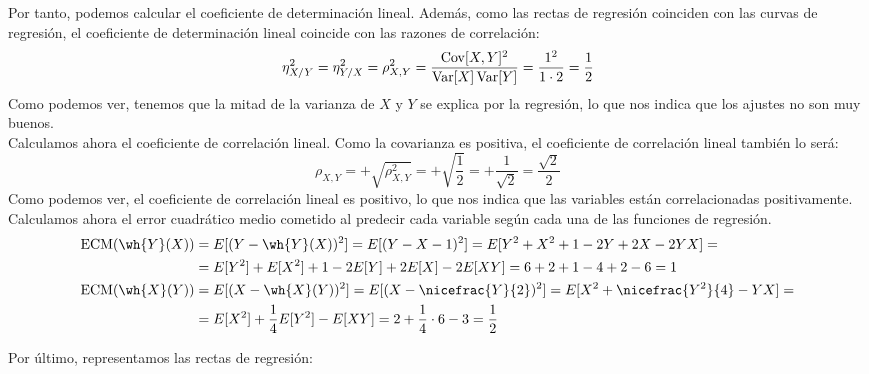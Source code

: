 \begin{ejercicio}
    Por tanto, podemos calcular el coeficiente de determinación lineal. Además, como las rectas de regresión coinciden con las curvas de regresión, el coeficiente de determinación lineal coincide con las razones de correlación:
    \begin{equation*}
        \eta_{X/Y}^2 = \eta_{Y/X}^2 = \rho_{X,Y}^2 = \dfrac{\operatorname{Cov}[X,Y]^2}{\operatorname{Var}[X]\operatorname{Var}[Y]} = \dfrac{1^2}{1\cdot 2} = \dfrac{1}{2}
    \end{equation*}
    Como podemos ver, tenemos que la mitad de la varianza de $X$ y $Y$ se explica por la regresión, lo que nos indica que los ajustes no son muy buenos.\\

    Calculamos ahora el coeficiente de correlación lineal. Como la covarianza es positiva, el coeficiente de correlación lineal también lo será:
    \begin{equation*}
        \rho_{X,Y} = +\sqrt{\rho_{X,Y}^2} = +\sqrt{\dfrac{1}{2}} = +\dfrac{1}{\sqrt{2}} = \dfrac{\sqrt{2}}{2}
    \end{equation*}
    Como podemos ver, el coeficiente de correlación lineal es positivo, lo que nos indica que las variables están correlacionadas positivamente.\\

    Calculamos ahora el error cuadrático medio cometido al predecir cada variable según cada una de las funciones de regresión.
    \begin{align*}
        \text{ECM}(\wh{Y}(X)) &= E[(Y-\wh{Y}(X))^2] = E[(Y-X-1)^2] = E[Y^2+X^2+1-2Y+2X-2YX] =\\
        &= E[Y^2]+E[X^2]+1-2E[Y]+2E[X]-2E[XY] = 6+2+1-4+2-6 = 1\\
        \text{ECM}(\wh{X}(Y)) &= E[(X-\wh{X}(Y))^2] = E[(X-\nicefrac{Y}{2})^2] = E[X^2+\nicefrac{Y^2}{4}-YX] =\\
        &= E[X^2]+\dfrac{1}{4}E[Y^2]-E[XY] = 2+\dfrac{1}{4}\cdot 6-3 = \frac{1}{2}
    \end{align*}

    Por último, representamos las rectas de regresión:
    \begin{figure}[H]
        \centering
    \end{figure}
\end{ejercicio}

